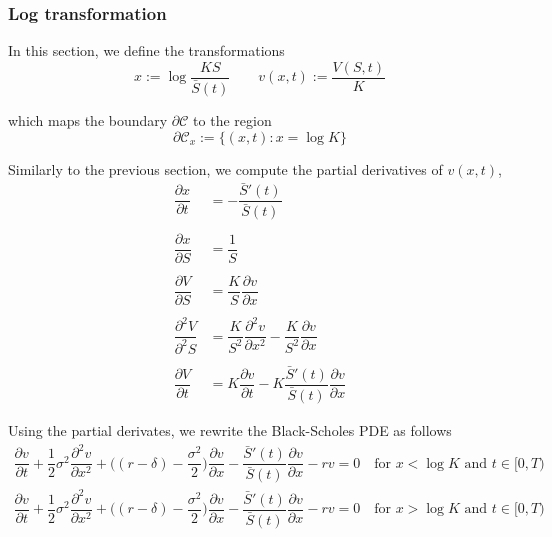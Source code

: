 \subsubsection{Log transformation}

In this section, we define the transformations
\begin{equation}
  x := \log \dfrac{KS}{\bar{S}(t)} \qquad v(x, t) := \dfrac{V(S, t)}{K}
\end{equation}

which maps the boundary $\partial \mathcal{C}$ to the region
\begin{equation}
  \partial{\mathcal{C}_x} := \{ (x, t): x = \log{K} \}  
\end{equation}

\newpage

Similarly to the previous section, we compute the partial derivatives of $v(x,t)$,
\begin{align*}
  \dfrac{\partial x}{\partial t} &= -\dfrac{\bar{S}'(t) }{\bar{S}(t)} \\\\
  \dfrac{\partial x}{\partial S} &= \dfrac{1}{S} \\\\ 
  \dfrac{\partial V}{\partial S} &= \dfrac{K}{S} \dfrac{\partial v}{\partial x} \\\\
  \dfrac{\partial^2 V}{\partial^2 S} &= \dfrac{K}{S^2}\dfrac{\partial^2 v}{\partial x^2} - \dfrac{K}{S^2} \dfrac{\partial v}{\partial x} \\\\
  \dfrac{\partial V}{\partial t} &= K \dfrac{\partial v}{\partial t} - K\dfrac{\bar{S}'(t)}{\bar{S}(t)}\dfrac{\partial v}{\partial x}
\end{align*}

Using the partial derivates, we rewrite the Black-Scholes PDE as follows
\begin{subequations}
  \begin{align}
      \dfrac{\partial v}{\partial t} + \dfrac{1}{2}\sigma^2\dfrac{\partial^2 v}{\partial x^2} + \bigg((r-\delta) - \dfrac{\sigma^2}{2} \bigg)\dfrac{\partial v}{\partial x} -\dfrac{\bar{S}'(t)}{\bar{S}(t)}\dfrac{\partial v}{\partial x} - rv = 0 \quad \text{for $x < \log{K}$ and $t \in [0, T)$} \\
      \dfrac{\partial v}{\partial t} + \dfrac{1}{2}\sigma^2\dfrac{\partial^2 v}{\partial x^2} + \bigg((r-\delta) - \dfrac{\sigma^2}{2} \bigg)\dfrac{\partial v}{\partial x} -\dfrac{\bar{S}'(t)}{\bar{S}(t)}\dfrac{\partial v}{\partial x} - rv = 0 \quad \text{for $x > \log{K}$ and $t \in [0, T)$}
  \end{align}
\end{subequations}

